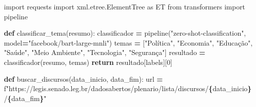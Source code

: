 \documentclass[
]{article}
\newenvironment{Shaded}{\begin{snugshade}}{\end{snugshade}}
\newcommand{\ControlFlowTok}[1]{\textcolor[rgb]{0.13,0.29,0.53}{\textbf{#1}}}
\newcommand{\DecValTok}[1]{\textcolor[rgb]{0.00,0.00,0.81}{#1}}
\newcommand{\ImportTok}[1]{#1}
\newcommand{\KeywordTok}[1]{\textcolor[rgb]{0.13,0.29,0.53}{\textbf{#1}}}
\newcommand{\NormalTok}[1]{#1}
\newcommand{\OperatorTok}[1]{\textcolor[rgb]{0.81,0.36,0.00}{\textbf{#1}}}
\newcommand{\SpecialCharTok}[1]{\textcolor[rgb]{0.81,0.36,0.00}{\textbf{#1}}}
\newcommand{\SpecialStringTok}[1]{\textcolor[rgb]{0.31,0.60,0.02}{#1}}
\newcommand{\StringTok}[1]{\textcolor[rgb]{0.31,0.60,0.02}{#1}}
\begin{document}
\begin{Shaded}
\begin{Highlighting}[]
\ImportTok{import}\NormalTok{ requests}
\ImportTok{import}\NormalTok{ xml.etree.ElementTree }\ImportTok{as}\NormalTok{ ET}
\ImportTok{from}\NormalTok{ transformers }\ImportTok{import}\NormalTok{ pipeline}

\KeywordTok{def}\NormalTok{ classificar\_tema(resumo):   }
\NormalTok{    classificador }\OperatorTok{=}\NormalTok{ pipeline(}\StringTok{"zero{-}shot{-}classification"}\NormalTok{, model}\OperatorTok{=}\StringTok{"facebook/bart{-}large{-}mnli"}\NormalTok{)}
\NormalTok{    temas }\OperatorTok{=}\NormalTok{ [}\StringTok{"Política"}\NormalTok{, }\StringTok{"Economia"}\NormalTok{, }\StringTok{"Educação"}\NormalTok{, }\StringTok{"Saúde"}\NormalTok{, }\StringTok{"Meio Ambiente"}\NormalTok{, }\StringTok{"Tecnologia"}\NormalTok{, }\StringTok{"Segurança"}\NormalTok{]    }
\NormalTok{    resultado }\OperatorTok{=}\NormalTok{ classificador(resumo, temas)   }
    \ControlFlowTok{return}\NormalTok{ resultado[}\StringTok{\textquotesingle{}labels\textquotesingle{}}\NormalTok{][}\DecValTok{0}\NormalTok{]}

\KeywordTok{def}\NormalTok{ buscar\_discursos(data\_inicio, data\_fim):}
\NormalTok{    url }\OperatorTok{=} \SpecialStringTok{f"https://legis.senado.leg.br/dadosabertos/plenario/lista/discursos/}\SpecialCharTok{\{}\NormalTok{data\_inicio}\SpecialCharTok{\}}\SpecialStringTok{/}\SpecialCharTok{\{}\NormalTok{data\_fim}\SpecialCharTok{\}}\SpecialStringTok{"}


\end{Highlighting}
\end{Shaded}
\end{document}
